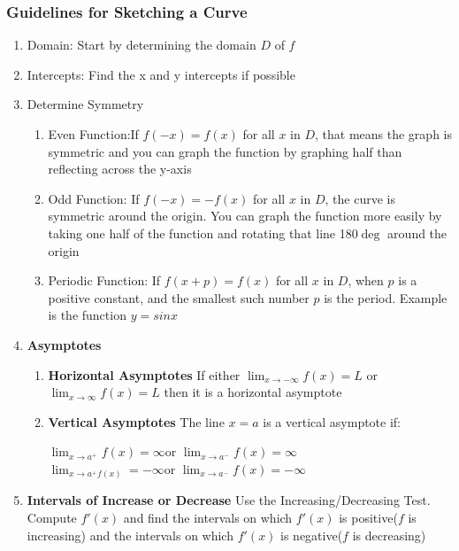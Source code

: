 \documentclass[10pt,a4paper]{article}
\begin{document}
	\subsubsection{Guidelines for Sketching a Curve}
		\begin{enumerate}
			\item Domain: Start by determining the domain $D$ of $f$
			\item Intercepts: Find the x and y intercepts if possible
			\item Determine Symmetry
				\begin{enumerate}
					\item Even Function:If $f(-x) = f(x)$ for all $x$ in $D$, that means the graph is symmetric and you can graph the function by graphing half than reflecting across the y-axis
					\item Odd Function: If $f(-x) = -f(x)$ for all $x$ in $D$, the curve is symmetric around the origin. You can graph the function more easily by taking one half of the function and rotating that line 180$\deg$ around the origin
					\item Periodic Function: If $f(x+p) = f(x)$ for all $x$ in $D$, when $p$ is a positive constant, and the smallest such number $p$ is the period. Example is the function $y=sin{x}$
				\end{enumerate}
			\item \textbf{Asymptotes}
				\begin{enumerate}
					\item \textbf{Horizontal Asymptotes} \quad If either $\lim_{x \rightarrow -\infty}{f(x)}=L$ or \linebreak $\lim_{x \rightarrow \infty}{f(x)} = L$ then it is a horizontal asymptote
					
					\item \textbf{Vertical Asymptotes} \quad  The line $x=a$ is a vertical asymptote if:
						\begin{center}
							$\lim_{x \rightarrow a^{+}}{f(x)} = \infty$\quad or \quad $\lim_{x \rightarrow a^{-}}{f(x)}=\infty $
\\							$\lim_{x \rightarrow a^{+}{f(x)}} = -\infty $\quad or \quad $\lim_{x \rightarrow a^{-}}{f(x)}= - \infty $
						\end{center}
				\end{enumerate}

			\item \textbf{Intervals of Increase or Decrease} Use the Increasing/Decreasing Test. Compute $f'(x)$ and find the intervals on which $f'(x)$ is positive($f$ is increasing) and the intervals on which $f'(x)$ is negative($f$ is decreasing)
			

\end{enumerate}
\end{document}
